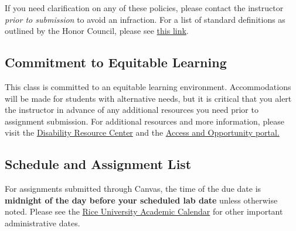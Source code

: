 \documentclass{article}
\begin{document}
If you need clarification on any of these policies, please contact the instructor \textit{prior to submission} to avoid an infraction. For a list of standard definitions as outlined by the Honor Council, please see \href{https://cpb-us-e1.wpmucdn.com/blogs.rice.edu/dist/c/490/files/2022/08/Honor-Council-Standard-Definitions-and-Policies.pdf}{this link}.

\subsection*{Commitment to Equitable Learning}
This class is committed to an equitable learning environment. Accommodations will be made for students with alternative needs, but it is critical that you alert the instructor in advance of any additional resources you need prior to assignment submission. For additional resources and more information, please visit the \href{https://drc.rice.edu/}{Disability Resource Center} and the \href{https://aop.rice.edu/}{Access and Opportunity portal.}
\pagebreak
\subsection*{Schedule and Assignment List}
For assignments submitted through Canvas, the time of the due date is \textbf{midnight of the day before your scheduled lab date} unless otherwise noted. Please see the \href{https://registrar.rice.edu/calendars/spring-semester-2023}{Rice University Academic Calendar} for other important administrative dates.\\
\end{document}
